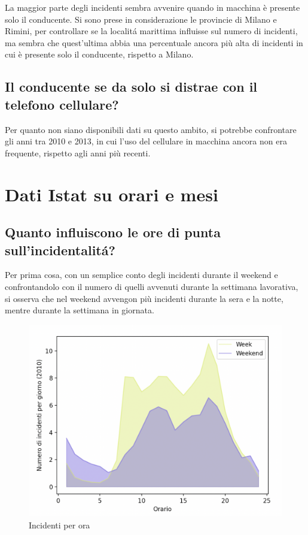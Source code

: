 \documentclass[a4paper]{report}
\begin{document}
La maggior parte degli incidenti sembra avvenire quando in macchina è presente solo il conducente.
Si sono prese in considerazione le provincie di Milano e Rimini, per controllare se la localit\'a 
marittima influisse sul numero di incidenti, ma sembra che quest'ultima abbia una percentuale 
ancora più alta di incidenti in cui è presente solo il conducente, rispetto a Milano.

\subsection{Il conducente se da solo si distrae con il telefono cellulare?}

Per quanto non siano disponibili dati su questo ambito, si potrebbe confrontare gli anni tra 2010 e 2013, 
in cui l'uso del cellulare in macchina ancora non era frequente, rispetto agli anni più recenti.



\section{Dati Istat su orari e mesi}

\subsection{Quanto influiscono le ore di punta sull'incidentalit\'a?}

Per prima cosa, con un semplice conto degli incidenti durante il weekend 
e confrontandolo con il numero di quelli avvenuti durante la 
settimana lavorativa, si osserva che nel weekend avvengon più incidenti 
durante la sera e la notte, mentre durante la settimana in giornata.

\begin{figure}
    \includegraphics[width=\linewidth]{../src/incidenti/incidenti_senza_coords/ore_punta/week_weekend.png}
    \caption{Incidenti per ora}
    \label{fig:week_weekend}
\end{figure}
\end{document}
